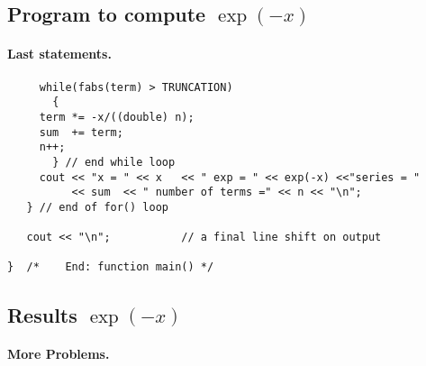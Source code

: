 \documentclass[%
oneside,                 %
final,                   %
10pt]{article}
\begin{document}
\subsection*{Program to compute $\exp{(-x)}$}


\paragraph{Last statements.}
\begin{verbatim}
     while(fabs(term) > TRUNCATION)
       {
	 term *= -x/((double) n);
	 sum  += term;
	 n++;
       } // end while loop
     cout << "x = " << x   << " exp = " << exp(-x) <<"series = "
          << sum  << " number of terms =" << n << "\n";
   } // end of for() loop

   cout << "\n";           // a final line shift on output

}  /*    End: function main() */
\end{verbatim}




\subsection*{Results $\exp{(-x)}$}


\paragraph{More Problems.}
\end{document}
